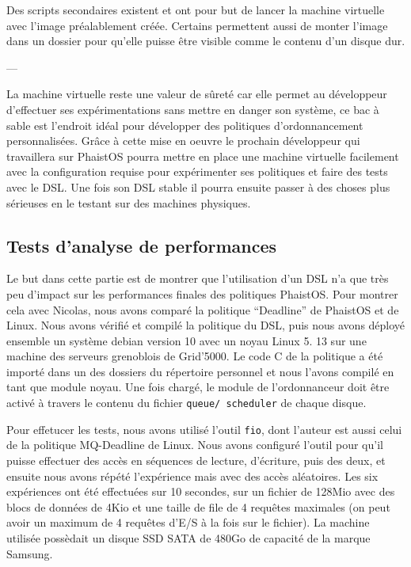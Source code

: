 Des scripts secondaires existent et ont pour but de lancer la machine virtuelle 
avec l'image préalablement créée. Certains permettent aussi de monter l'image 
dans un dossier pour qu'elle puisse être visible comme le contenu d'un disque 
dur.

\begin{center}
---
\end{center}
    
La machine virtuelle reste une valeur de sûreté car elle permet au développeur 
d'effectuer ses expérimentations sans mettre en danger son système, ce bac à 
sable est l'endroit idéal pour développer des politiques d'ordonnancement 
personnalisées. Grâce à cette mise en oeuvre le prochain développeur qui 
travaillera sur PhaistOS pourra mettre en place une machine virtuelle 
facilement avec la configuration requise pour expérimenter ses politiques et 
faire des tests avec le DSL. Une fois son DSL stable il pourra ensuite passer à 
des choses plus sérieuses en le testant sur des machines physiques.

\subsection{Tests d'analyse de performances}

Le but dans cette partie est de montrer que l'utilisation d'un DSL n'a que très 
peu d'impact sur les performances finales des politiques PhaistOS. Pour 
montrer cela avec Nicolas, nous avons comparé la politique ``Deadline'' de 
PhaistOS et de Linux. Nous avons vérifié et compilé la politique du DSL, puis 
nous avons déployé ensemble un système debian version 10 avec un noyau Linux 5.
13 sur une machine des serveurs grenoblois de Grid'5000. Le code C de la 
politique a été importé dans un des dossiers du répertoire personnel et nous 
l'avons compilé en tant que module noyau. Une fois chargé, le module de 
l'ordonnanceur doit être activé à travers le contenu du fichier \texttt{queue/
scheduler} de chaque disque.

Pour effetucer les tests, nous avons utilisé l'outil \texttt{fio}, dont 
l'auteur est aussi celui de la politique MQ-Deadline de Linux. Nous avons 
configuré l'outil pour qu'il puisse effectuer des accès en séquences de 
lecture, d'écriture, puis des deux, et ensuite nous avons répété l'expérience 
mais avec des accès aléatoires. Les six expériences ont été effectuées sur 10 
secondes, sur un fichier de 128Mio avec des blocs de données de 4Kio et une 
taille de file de 4 requêtes maximales (on peut avoir un maximum de 4 requêtes 
d'E/S à la fois sur le fichier). La machine utilisée possèdait un disque SSD 
SATA de 480Go de capacité de la marque Samsung.

